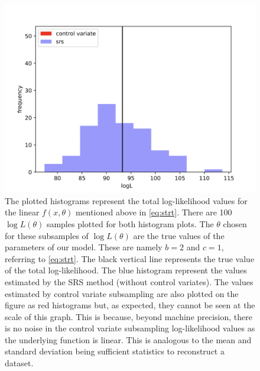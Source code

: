 \begin{figure} 
\centering    
\includegraphics[width=1.0\textwidth]{Chapter3/Figs/regen3_28.png}
\caption{ The plotted histograms represent the total log-likelihood values for the linear $f(x,\theta)$ mentioned above in \cref{eq:strt}. There are 100 $\log L(\theta)$ samples plotted for both histogram plots. The $\theta$ chosen for these subsamples of $\log L(\theta)$ are the true values of the parameters of our model. These are namely $b=2$ and $c=1$, referring to \cref{eq:strt}. The black vertical line represents the true value of the total log-likelihood. The blue histogram represent the values estimated by the SRS method (without control variates). The values estimated by control variate subsampling are also plotted on the figure as red histograms but, as expected, they cannot be seen at the scale of this graph. This is because, beyond machine precision, there is no noise in the control variate subsampling log-likelihood values as the underlying function is linear. This is analogous to the mean and standard deviation being sufficient statistics to reconstruct a dataset.}
\label{fig:two}
\end{figure}

